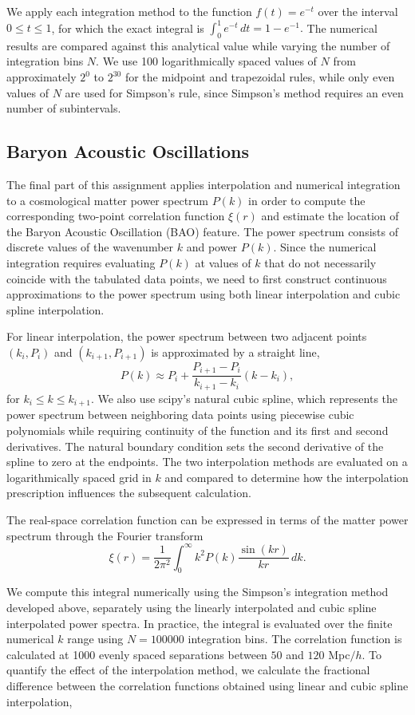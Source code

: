 \documentclass[a4paper,11pt]{article}
\begin{document}
We apply each integration method to the function $f(t)=e^{-t}$ over the interval $0 \leq t \leq 1$, for which the exact integral is $\int_0^1 e^{-t}\,dt = 1-e^{-1}.$ The numerical results are compared against this analytical value while varying the number of integration bins $N$. We use 100 logarithmically spaced values of $N$ from approximately $2^0$ to $2^{30}$ for the midpoint and trapezoidal rules, while only even values of $N$ are used for Simpson's rule, since Simpson's method requires an even number of subintervals.

\subsection*{Baryon Acoustic Oscillations}

The final part of this assignment applies interpolation and numerical integration to a cosmological matter power spectrum $P(k)$ in order to compute the corresponding two-point correlation function $\xi(r)$ and estimate the location of the Baryon Acoustic Oscillation (BAO) feature. The power spectrum consists of discrete values of the wavenumber $k$ and power $P(k)$. Since the numerical integration requires evaluating $P(k)$ at values of $k$ that do not necessarily coincide with the tabulated data points, we need to first construct continuous approximations to the power spectrum using both linear interpolation and cubic spline interpolation.

For linear interpolation, the power spectrum between two adjacent points $(k_i,P_i)$ and $(k_{i+1},P_{i+1})$ is approximated by a straight line, \[P(k) \approx P_i + \frac{P_{i+1}-P_i}{k_{i+1}-k_i}(k-k_i),\] for $k_i \leq k \leq k_{i+1}$. We also use scipy's natural cubic spline, which represents the power spectrum between neighboring data points using piecewise cubic polynomials while requiring continuity of the function and its first and second derivatives. The natural boundary condition sets the second derivative of the spline to zero at the endpoints. The two interpolation methods are evaluated on a logarithmically spaced grid in $k$ and compared to determine how the interpolation prescription influences the subsequent calculation.

The real-space correlation function can be expressed in terms of the matter power spectrum through the Fourier transform \[\xi(r) = \frac{1}{2\pi^2} \int_0^\infty k^2 P(k) \frac{\sin(kr)}{kr}\,dk.\]

We compute this integral numerically using the Simpson's integration method developed above, separately using the linearly interpolated and cubic spline interpolated power spectra. In practice, the integral is evaluated over the finite numerical $k$ range using $N=100000$ integration bins. The correlation function is calculated at 1000 evenly spaced separations between $50$ and $120$ Mpc$/h$. To quantify the effect of the interpolation method, we calculate the fractional difference between the correlation functions obtained using linear and cubic spline interpolation,
\end{document}
